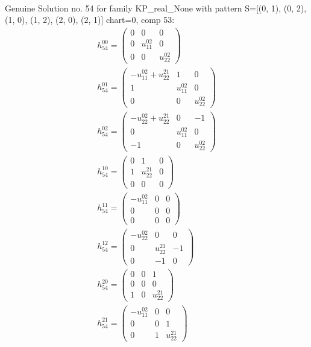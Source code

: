 \documentclass[a4paper, 11pt, twoside, onecolumn]{article}
\begin{document}
\begin{landscape}
\begin{gather*}
\end{gather*} 
Genuine Solution no. 54 for family KP_real_None with pattern S=[(0, 1), (0, 2), (1, 0), (1, 2), (2, 0), (2, 1)] chart=0, comp 53: 
\begin{gather*} 
	 h_{54}^{00}=\begin{pmatrix}0 & 0 & 0\\0 & u^{02}_{11} & 0\\0 & 0 & u^{02}_{22}\end{pmatrix}\\ 
	 h_{54}^{01}=\begin{pmatrix}- u^{02}_{11} + u^{21}_{22} & 1 & 0\\1 & u^{02}_{11} & 0\\0 & 0 & u^{02}_{22}\end{pmatrix}\\ 
	 h_{54}^{02}=\begin{pmatrix}- u^{02}_{22} + u^{21}_{22} & 0 & -1\\0 & u^{02}_{11} & 0\\-1 & 0 & u^{02}_{22}\end{pmatrix}\\ 
	 h_{54}^{10}=\begin{pmatrix}0 & 1 & 0\\1 & u^{21}_{22} & 0\\0 & 0 & 0\end{pmatrix}\\ 
	 h_{54}^{11}=\begin{pmatrix}- u^{02}_{11} & 0 & 0\\0 & 0 & 0\\0 & 0 & 0\end{pmatrix}\\ 
	 h_{54}^{12}=\begin{pmatrix}- u^{02}_{22} & 0 & 0\\0 & u^{21}_{22} & -1\\0 & -1 & 0\end{pmatrix}\\ 
	 h_{54}^{20}=\begin{pmatrix}0 & 0 & 1\\0 & 0 & 0\\1 & 0 & u^{21}_{22}\end{pmatrix}\\ 
	 h_{54}^{21}=\begin{pmatrix}- u^{02}_{11} & 0 & 0\\0 & 0 & 1\\0 & 1 & u^{21}_{22}\end{pmatrix}\\ 

\end{gather*}
\end{landscape}
\end{document}
